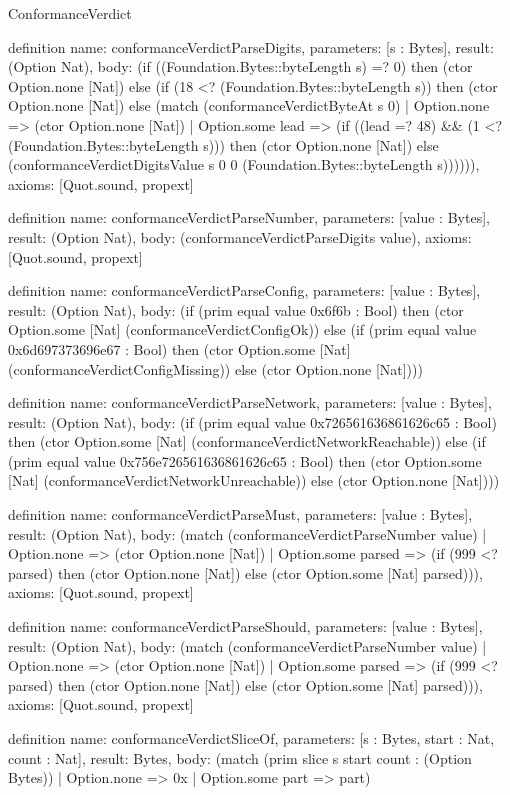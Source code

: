 \begin{lexlean}{ConformanceVerdict}
\begin{semanticmodule}
definition{
  name: conformanceVerdictParseDigits,
  parameters: [s : Bytes],
  result: (Option Nat),
  body: (if ((Foundation.Bytes::byteLength s) =? 0) then (ctor Option.none [Nat]) else (if (18 <? (Foundation.Bytes::byteLength s)) then (ctor Option.none [Nat]) else (match (conformanceVerdictByteAt s 0)
    | Option.none => (ctor Option.none [Nat])
    | Option.some lead => (if ((lead =? 48) && (1 <? (Foundation.Bytes::byteLength s))) then (ctor Option.none [Nat]) else (conformanceVerdictDigitsValue s 0 0 (Foundation.Bytes::byteLength s)))))),
  axioms: [Quot.sound, propext]
}

definition{
  name: conformanceVerdictParseNumber,
  parameters: [value : Bytes],
  result: (Option Nat),
  body: (conformanceVerdictParseDigits value),
  axioms: [Quot.sound, propext]
}

definition{
  name: conformanceVerdictParseConfig,
  parameters: [value : Bytes],
  result: (Option Nat),
  body: (if (prim equal value 0x6f6b : Bool) then (ctor Option.some [Nat] (conformanceVerdictConfigOk)) else (if (prim equal value 0x6d697373696e67 : Bool) then (ctor Option.some [Nat] (conformanceVerdictConfigMissing)) else (ctor Option.none [Nat])))
}

definition{
  name: conformanceVerdictParseNetwork,
  parameters: [value : Bytes],
  result: (Option Nat),
  body: (if (prim equal value 0x726561636861626c65 : Bool) then (ctor Option.some [Nat] (conformanceVerdictNetworkReachable)) else (if (prim equal value 0x756e726561636861626c65 : Bool) then (ctor Option.some [Nat] (conformanceVerdictNetworkUnreachable)) else (ctor Option.none [Nat])))
}

definition{
  name: conformanceVerdictParseMust,
  parameters: [value : Bytes],
  result: (Option Nat),
  body: (match (conformanceVerdictParseNumber value)
    | Option.none => (ctor Option.none [Nat])
    | Option.some parsed => (if (999 <? parsed) then (ctor Option.none [Nat]) else (ctor Option.some [Nat] parsed))),
  axioms: [Quot.sound, propext]
}

definition{
  name: conformanceVerdictParseShould,
  parameters: [value : Bytes],
  result: (Option Nat),
  body: (match (conformanceVerdictParseNumber value)
    | Option.none => (ctor Option.none [Nat])
    | Option.some parsed => (if (999 <? parsed) then (ctor Option.none [Nat]) else (ctor Option.some [Nat] parsed))),
  axioms: [Quot.sound, propext]
}

definition{
  name: conformanceVerdictSliceOf,
  parameters: [s : Bytes, start : Nat, count : Nat],
  result: Bytes,
  body: (match (prim slice s start count : (Option Bytes))
    | Option.none => 0x
    | Option.some part => part)
}


\end{semanticmodule}
\end{lexlean}
